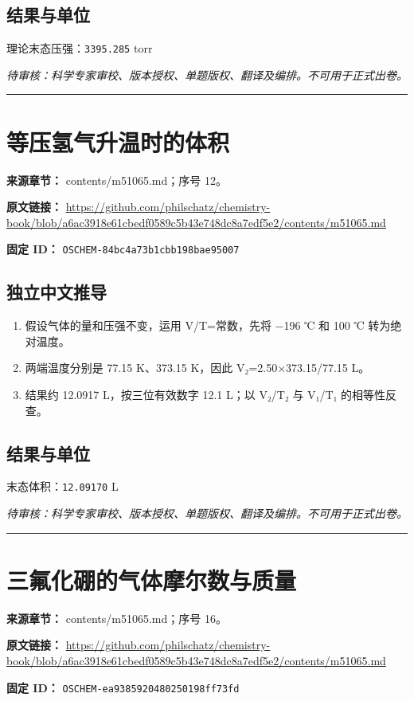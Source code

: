 \documentclass[UTF8,11pt,oneside,openany,fontset=none]{ctexbook}
\begin{document}
\subsection*{结果与单位}
\noindent 理论末态压强：\texttt{3395.285} torr\par
\noindent\textit{待审核：科学专家审校、版本授权、单题版权、翻译及编排。不可用于正式出卷。}
\medskip\hrule\medskip
\section{等压氢气升温时的体积}
\noindent\textbf{来源章节：} contents/m51065.md；序号 12。\par
\noindent\textbf{原文链接：} \url{https://github.com/philschatz/chemistry-book/blob/a6ac3918e61cbedf0589c5b43e748dc8a7edf5e2/contents/m51065.md}\par
\noindent\textbf{固定 ID：} \texttt{OSCHEM-84bc4a73b1cbb198bae95007}\par
\subsection*{独立中文推导}
\begin{enumerate}
\item 假设气体的量和压强不变，运用 V/T=常数，先将 −196 ℃ 和 100 ℃ 转为绝对温度。
\item 两端温度分别是 77.15 K、373.15 K，因此 V₂=2.50×373.15/77.15 L。
\item 结果约 12.0917 L，按三位有效数字 12.1 L；以 V₂/T₂ 与 V₁/T₁ 的相等性反查。
\end{enumerate}
\subsection*{结果与单位}
\noindent 末态体积：\texttt{12.09170} L\par
\noindent\textit{待审核：科学专家审校、版本授权、单题版权、翻译及编排。不可用于正式出卷。}
\medskip\hrule\medskip
\section{三氟化硼的气体摩尔数与质量}
\noindent\textbf{来源章节：} contents/m51065.md；序号 16。\par
\noindent\textbf{原文链接：} \url{https://github.com/philschatz/chemistry-book/blob/a6ac3918e61cbedf0589c5b43e748dc8a7edf5e2/contents/m51065.md}\par
\noindent\textbf{固定 ID：} \texttt{OSCHEM-ea9385920480250198ff73fd}\par
\end{document}
